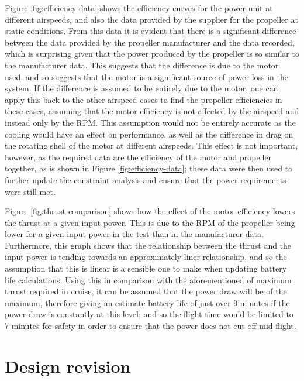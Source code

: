 \documentclass[../../main.tex]{subfiles}
\begin{document}
Figure \ref{fig:efficiency-data} shows the efficiency curves for the power unit at different airspeeds, and also the data provided by the supplier for the propeller at static conditions.
From this data it is evident that there is a significant difference between the data provided by the propeller manufacturer and the data recorded, which is surprising given that the power produced by the propeller is so similar to the manufacturer data.
This suggests that the difference is due to the motor used, and so suggests that the motor is a significant source of power loss in the system.
If the difference is assumed to be entirely due to the motor, one can apply this back to the other airspeed cases to find the propeller efficiencies in these cases, assuming that the motor efficiency is not affected by the airspeed and instead only by the RPM.
This assumption would not be entirely accurate as the cooling would have an effect on performance, as well as the difference in drag on the rotating shell of the motor at different airspeeds.
This effect is not important, however, as the required data are the efficiency of the motor and propeller together, as is shown in Figure \ref{fig:efficiency-data}; these data were then used to further update the constraint analysis and ensure that the power requirements were still met. 


Figure \ref{fig:thrust-comparison} shows how the effect of the motor efficiency lowers the thrust at a given input power.
This is due to the RPM of the propeller being lower for a given input power in the test than in the manufacturer data.
Furthermore, this graph shows that the relationship between the thrust and the input power is tending towards an approximately liner relationship, and so the assumption that this is linear is a sensible one to make when updating battery life calculations.
Using this in comparison with the aforementioned  of maximum thrust required in cruise, it can be assumed that the power draw will be  of the maximum, therefore giving an estimate battery life of just over 9 minutes if the power draw is constantly at this level; and so the flight time would be limited to 7 minutes for safety in order to ensure that the power does not cut off mid-flight. 

\section{Design revision} \label{sec:design-process:design-revision}
\end{document}
